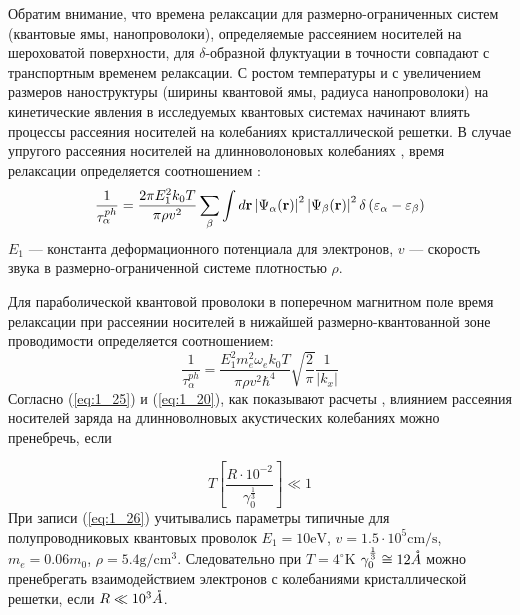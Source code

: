 Обратим внимание, что времена релаксации для размерно-ограниченных систем (квантовые ямы, нанопроволоки), определяемые рассеянием носителей на шероховатой поверхности, для $\delta$-образной флуктуации в точности совпадают с транспортным временем релаксации. 
С ростом температуры и с увеличением размеров наноструктуры (ширины квантовой ямы, радиуса нанопроволоки) на кинетические явления в исследуемых квантовых системах начинают влиять процессы рассеяния носителей на колебаниях кристаллической решетки. В случае упругого рассеяния носителей на длинноволоновых колебаниях \cite{Anselm1978}, время релаксации определяется соотношением \cite{Khamidullin2006}:
\begin{equation}
\frac{1}{\tau^{ph}_\alpha} = \frac{2\pi E^2_1 k_0 T}{\pi\rho v^2} \sum_\beta{ \int{d\vect{r}\left|\Psi_\alpha(\vect{r})\right|^2 \left|\Psi_\beta(\vect{r})\right|^2 \delta\left(\varepsilon_\alpha-\varepsilon_\beta\right)}}
\end{equation}
$E_1$ --- константа деформационного потенциала для электронов, $v$ --- скорость звука в размерно-ограниченной системе плотностью $\rho$.

Для параболической квантовой проволоки в поперечном магнитном поле время релаксации при рассеянии носителей в нижайшей размерно-квантованной зоне проводимости определяется соотношением:
\begin{equation}
\label{eq:1_25}
\frac{1}{\tau^{ph}_\alpha}=\frac{E^2_1 m^2_e \omega_e k_0 T}{\pi \rho v^2 \hbar^4}\sqrt{\frac{2}{\pi}} \frac{1}{\left|k_x\right|}
\end{equation}
Согласно (\ref{eq:1_25}) и (\ref{eq:1_20}), как показывают расчеты \cite{Kostyukevich2013, Solovenko2014}, влиянием рассеяния носителей заряда на длинноволновых акустических колебаниях можно пренебречь, если

\begin{equation}
\label{eq:1_26}
T\left[\frac{R \cdot 10^{-2}}{\gamma^{\frac{1}{3}}_0}\right] \ll 1
\end{equation}
При записи (\ref{eq:1_26}) учитывались параметры типичные для полупроводниковых квантовых проволок $E_1=10 \text{eV}$, $v=1.5\cdot 10^5 \text{cm/s}$, $m_e=0.06 m_0$, $\rho=5.4\text{g}/\text{cm}^3$. Следовательно при $T=4^{\circ} \text{K}$  $\gamma_0^{\frac{1}{3}} \cong 12 \AA$ можно пренебрегать взаимодействием электронов с колебаниями кристаллической решетки, если $R \ll 10^3 \AA$.
